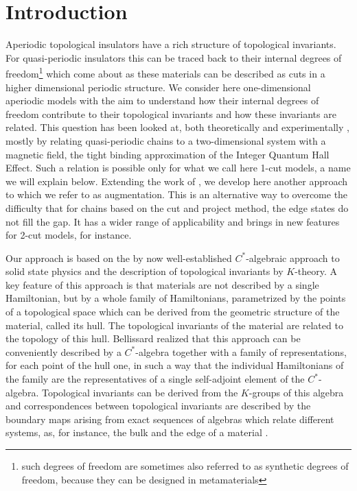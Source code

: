 \documentclass[11pt]{amsart}
\begin{document}
\section{Introduction}
Aperiodic topological insulators have a rich structure of topological invariants. For quasi-periodic insulators this can be traced back to their internal degrees of freedom\footnote{such degrees of freedom are sometimes also referred to as synthetic degrees of freedom, because they can be designed in metamaterials}  
which come about as these materials can be described as cuts in a higher dimensional periodic structure.  
We consider here one-dimensional aperiodic models with the aim to understand how their internal degrees of freedom contribute to their topological invariants and how these invariants are related. This question has been looked at, both theoretically and experimentally \cite{kraus2012topological,verbin2015topological,dana2014topologically,baboux2017measuring,jagannathan2025missing}, mostly by relating quasi-periodic chains to a two-dimensional system with a magnetic field, the tight binding approximation of the Integer Quantum Hall Effect. Such a relation is possible only for what we call here 1-cut models, a name we will explain below.  
Extending the work of \cite{kellendonk_prodan}, we develop here another approach to which we refer to as augmentation. This is an alternative way to overcome the difficulty that for chains based on the cut and project method, the edge states do not fill the gap. It has a wider range of applicability and brings in new features for 2-cut models, for instance.
 
Our approach is based on the by now well-established $C^*$-algebraic approach to solid state physics and the description of topological invariants by $K$-theory. A key feature of this approach is that materials are not described by a single Hamiltonian, but by a whole family of Hamiltonians, parametrized by the points of a topological space which can be derived from the geometric structure of the material, called its hull. The topological invariants of the material are related to the topology of this hull.   
 Bellissard realized that this approach \cite{Bellissard1992} can be conveniently described by a $C^*$-algebra together with a family of representations, for each point of the hull one, in such a way that the individual Hamiltonians of the family are the representatives of a single self-adjoint element of the $C^*$-algebra. Topological invariants can be derived from the $K$-groups of this algebra and correspondences between topological invariants are described by the boundary maps arising from exact sequences of algebras which relate different systems, as, for instance, the bulk and the edge of a material \cite{KelRichBal}. 
\end{document}
